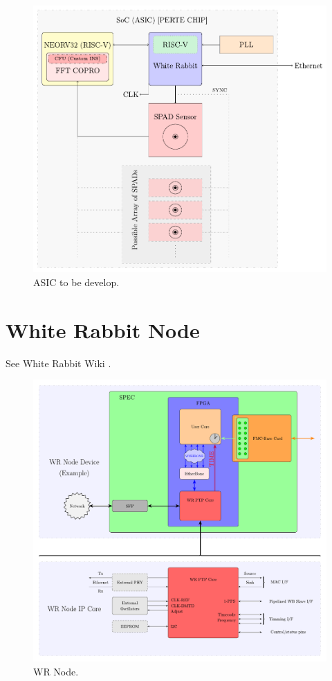 \begin{figure}[H]
    \centering
    \includegraphics[width=14cm]{figures/ASIC-Scheme.pdf}
    \caption{ASIC to be develop.}
    \label{fig:ASIC}
\end{figure}

\newpage

\section{White Rabbit Node}

See White Rabbit Wiki \cite{WR:wiki}.

\begin{figure}[H]
    \centering
    \includegraphics[width=15cm]{figures/WR_node.pdf}
    \caption{WR Node.}
    \label{fig:WR-NODE}
\end{figure}

